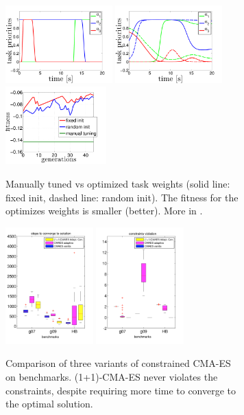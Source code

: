 \begin{figure}[h!]
    \centering
    \begin{subfigure}[t]{0.9\textwidth}
        \centering
      \includegraphics[height=3cm]{images/v_alphas_hand}
	\includegraphics[height=3cm]{images/v_alpha_combine}
	\includegraphics[height=3cm]{images/v_fitness_comp_3task_kinova1}
    \caption{Manually tuned vs optimized task weights (solid line: fixed init, dashed line: random init). The fitness for the optimizes weights is smaller (better). More in \cite{Modugno2016}.}
        \label{fig:valerio:framework}
    \end{subfigure}%
    
    \begin{subfigure}[t]{0.9\textwidth}
        \centering
        \includegraphics[height=4.5cm]{images/v_to_steady.png}
        \includegraphics[height=4.5cm]{images/v_viol.png}
        \caption{Comparison of three variants of constrained CMA-ES on benchmarks. (1+1)-CMA-ES never violates the constraints, despite requiring more time to converge to the optimal solution.}
        \label{fig:valerio:constraints}
    \end{subfigure}
    \caption{}
\end{figure}

